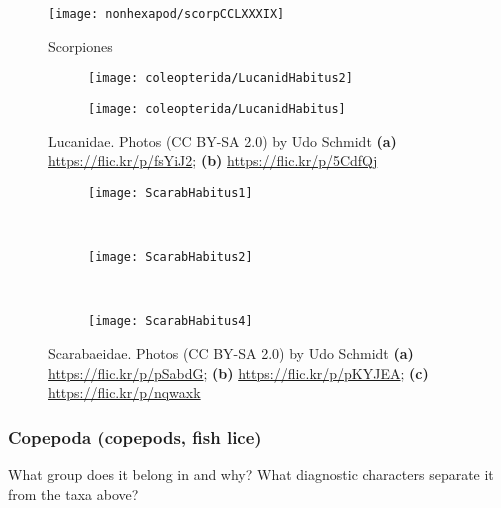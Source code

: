 \begin{figure}[ht!]
  \centering
    \texttt{[image: nonhexapod/scorpCCLXXXIX]}
  \caption{Scorpiones \cite[][Plate CCLXXXIX]{bhlitem55834arach}}
  \label{fig:scorpion}
\end{figure}%


\begin{figure}[ht!]
  \centering
\begin{subfigure}[ht!]{0.42\textwidth}
    \texttt{[image: coleopterida/LucanidHabitus2]}
  \caption{}
  \label{fig:lucanid1}%
\end{subfigure}
    \qquad
\begin{subfigure}[ht!]{0.47\textwidth}
    \texttt{[image: coleopterida/LucanidHabitus]}
  \caption{}
  \label{fig:lucanid}\end{subfigure}%
    \caption{Lucanidae. Photos (CC BY-SA 2.0) by Udo Schmidt \textbf{(a)}  \url{https://flic.kr/p/fsYiJ2}; \textbf{(b)} \url{https://flic.kr/p/5CdfQj}}\label{fig:lucanids}
\end{figure}



\begin{figure}[ht!]
  \centering
\begin{subfigure}[ht!]{0.25\textwidth}
    \texttt{[image: ScarabHabitus1]}
  \caption{}
  \label{fig:scarabaeid1}
\end{subfigure}
    ~
\begin{subfigure}[ht!]{0.25\textwidth}
    \texttt{[image: ScarabHabitus2]}
  \caption{}
  \label{fig:scarabaeid2}
\end{subfigure}
    ~
\begin{subfigure}[ht!]{0.23\textwidth}
    \texttt{[image: ScarabHabitus4]}
  \caption{}
  \label{fig:scarabaeid3}
\end{subfigure}
    \caption{Scarabaeidae. Photos (CC BY-SA 2.0) by Udo Schmidt \textbf{(a)}  \url{https://flic.kr/p/pSabdG}; \textbf{(b)} \url{https://flic.kr/p/pKYJEA}; \textbf{(c)}  \url{https://flic.kr/p/nqwaxk}}\label{fig:scarabaeids}
\end{figure}%



\subsubsection*{Copepoda (copepods, fish lice)}
What group does it belong in and why? What diagnostic characters separate it from the taxa above?\\

